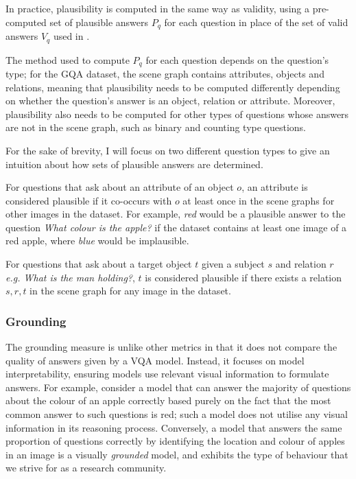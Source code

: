 In practice, plausibility is computed in the same way as validity, using a pre-computed set of plausible answers \(P_q\)  for each question in place of the set of valid answers \(V_q\) used in \equationautorefname{ \ref{equation:validity}}.

The method used to compute \(P_q\) for each question depends on the question's type; for the GQA dataset, the scene graph contains attributes, objects and relations, meaning that plausibility needs to be computed differently depending on whether the question's answer is an object, relation or attribute. Moreover, plausibility also needs to be computed for other types of questions whose answers are not in the scene graph, such as binary and counting type questions.

For the sake of brevity, I will focus on two different question types to give an intuition about how sets of plausible answers are determined.

For questions that ask about an attribute of an object \(o\), an attribute is considered plausible if it co-occurs with \(o\) at least once in the scene graphs for other images in the dataset. For example, \textit{red} would be a plausible answer to the question \textit{What colour is the apple?} if the dataset contains at least one image of a red apple, where \textit{blue} would be implausible.

For questions that ask about a target object \(t\) given a subject \(s\) and relation \(r\) \textit{e.g. What is the man holding?}, \(t\) is considered plausible if there exists a relation \(s, r, t\) in the scene graph for any image in the dataset. 

\subsubsection{Grounding}

The grounding measure is unlike other metrics in that it does not compare the quality of answers given by a VQA model. Instead, it focuses on model interpretability, ensuring models use relevant visual information to formulate answers. For example, consider a model that can answer the majority of questions about the colour of an apple correctly based purely on the fact that the most common answer to such questions is red; such a model does not utilise any visual information in its reasoning process. Conversely, a model that answers the same proportion of questions correctly by identifying the location and colour of apples in an image is a visually \textit{grounded} model, and exhibits the type of behaviour that we strive for as a research community.

